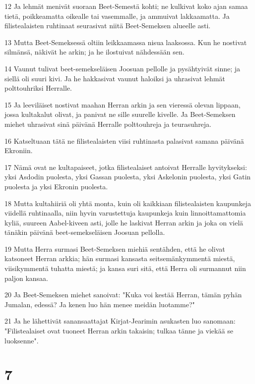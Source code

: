\par 12 Ja lehmät menivät suoraan Beet-Semestä kohti; ne kulkivat koko ajan samaa tietä, poikkeamatta oikealle tai vasemmalle, ja ammuivat lakkaamatta. Ja filistealaisten ruhtinaat seurasivat niitä Beet-Semeksen alueelle asti.
\par 13 Mutta Beet-Semeksessä oltiin leikkaamassa nisua laaksossa. Kun he nostivat silmänsä, näkivät he arkin; ja he ilostuivat nähdessään sen.
\par 14 Vaunut tulivat beet-semekseläisen Joosuan pellolle ja pysähtyivät sinne; ja siellä oli suuri kivi. Ja he hakkasivat vaunut haloiksi ja uhrasivat lehmät polttouhriksi Herralle.
\par 15 Ja leeviläiset nostivat maahan Herran arkin ja sen vieressä olevan lippaan, jossa kultakalut olivat, ja panivat ne sille suurelle kivelle. Ja Beet-Semeksen miehet uhrasivat sinä päivänä Herralle polttouhreja ja teurasuhreja.
\par 16 Katseltuaan tätä ne filistealaisten viisi ruhtinasta palasivat samana päivänä Ekroniin.
\par 17 Nämä ovat ne kultapaiseet, jotka filistealaiset antoivat Herralle hyvitykseksi: yksi Asdodin puolesta, yksi Gassan puolesta, yksi Askelonin puolesta, yksi Gatin puolesta ja yksi Ekronin puolesta.
\par 18 Mutta kultahiiriä oli yhtä monta, kuin oli kaikkiaan filistealaisten kaupunkeja viidellä ruhtinaalla, niin hyvin varustettuja kaupunkeja kuin linnoittamattomia kyliä, suureen Aabel-kiveen asti, jolle he laskivat Herran arkin ja joka on vielä tänäkin päivänä beet-semekseläisen Joosuan pellolla.
\par 19 Mutta Herra surmasi Beet-Semeksen miehiä sentähden, että he olivat katsoneet Herran arkkia; hän surmasi kansasta seitsemänkymmentä miestä, viisikymmentä tuhatta miestä; ja kansa suri sitä, että Herra oli surmannut niin paljon kansaa.
\par 20 Ja Beet-Semeksen miehet sanoivat: "Kuka voi kestää Herran, tämän pyhän Jumalan, edessä? Ja kenen luo hän menee meidän luotamme?"
\par 21 Ja he lähettivät sanansaattajat Kirjat-Jearimin asukasten luo sanomaan: "Filistealaiset ovat tuoneet Herran arkin takaisin; tulkaa tänne ja viekää se luoksenne".

\chapter{7}

